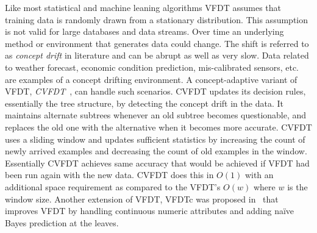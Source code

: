Like most statistical and machine leaning algorithms VFDT assumes that training data is randomly drawn from a stationary distribution. This assumption is not valid for large databases and data streams. Over time an underlying method or environment that generates data could change. The shift is  referred to as {\it concept drift} in literature and can be abrupt as well as very slow. Data related to weather forecast, economic condition prediction, mis-calibrated sensors, etc. are examples of a concept drifting environment. A concept-adaptive variant of VFDT, \textit{CVFDT}~\cite{hulten01:cvfdt}, can handle such scenarios. CVFDT updates its decision rules, essentially the tree structure, by detecting the concept drift in the data. It maintains alternate subtrees whenever an old subtree becomes questionable, and replaces the old one with the alternative when it becomes more accurate. CVFDT uses a sliding window and updates sufficient statistics by increasing the count of newly arrived examples and decreasing the count of old examples in the window. Essentially CVFDT achieves same accuracy that would be achieved if VFDT had been run again with the new data. CVFDT does this in $O(1)$ with an additional space requirement as compared to the VFDT's $O(w)$ where $w$ is the window size. Another extension of VFDT, VFDTc was proposed in~\cite{gama05:vfdtc} that improves VFDT by handling continuous numeric attributes and adding na\"ive Bayes prediction at the leaves.




